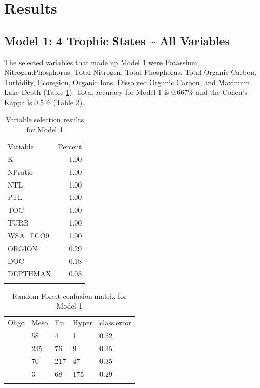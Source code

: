 \documentclass[11pt,]{article}
\begin{document}
\section{Results}\label{results}

\subsection{Model 1: 4 Trophic States \textasciitilde{} All
Variables}\label{model-1-4-trophic-states-all-variables}

The selected variables that made up Model 1 were Potassium,
Nitrogen:Phosphorus, Total Nitrogen, Total Phosphorus, Total Organic
Carbon, Turbidity, Ecoregion, Organic Ions, Dissolved Organic Carbon,
and Maximum Lake Depth (Table \ref{tab:VarSel_Model1}). Total accuracy
for Model 1 is 0.667\% and the Cohen's Kappa is 0.546 (Table
\ref{tab:Confusion_Model1}).

\begin{longtable}[c]{@{}lr@{}}
\toprule\addlinespace
Variable & Percent
\\\addlinespace
\midrule\endhead
K & 1.00
\\\addlinespace
NPratio & 1.00
\\\addlinespace
NTL & 1.00
\\\addlinespace
PTL & 1.00
\\\addlinespace
TOC & 1.00
\\\addlinespace
TURB & 1.00
\\\addlinespace
WSA\_ECO9 & 1.00
\\\addlinespace
ORGION & 0.29
\\\addlinespace
DOC & 0.18
\\\addlinespace
DEPTHMAX & 0.03
\\\addlinespace
\bottomrule
\addlinespace
\caption{Variable selection results for Model
1\label{tab:VarSel_Model1}}
\end{longtable}

\begin{longtable}[c]{@{}lllll@{}}
\toprule\addlinespace
Oligo & Meso & Eu & Hyper & class.error
\\\addlinespace
\midrule\endhead
135 & 58 & 4 & 1 & 0.32
\\\addlinespace
42 & 235 & 76 & 9 & 0.35
\\\addlinespace
2 & 70 & 217 & 47 & 0.35
\\\addlinespace
0 & 3 & 68 & 175 & 0.29
\\\addlinespace
\bottomrule
\addlinespace
\caption{Random Forest confusion matrix for Model
1\label{tab:Confusion_Model1}}
\end{longtable}
\end{document}
